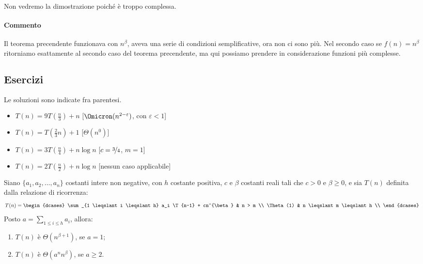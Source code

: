 Non vedremo la dimostrazione poiché è troppo complessa.

\paragraph{Commento}
Il teorema precendente funzionava con \(n^{\beta}\), aveva una serie di condizioni semplificative, ora non ci sono più.
Nel secondo caso se \(f(n) = n^{\beta}\) ritorniamo esattamente al secondo caso del teorema precendente, ma qui possiamo prendere in considerazione funzioni più complesse.

\subsection*{Esercizi}

Le soluzioni sono indicate fra parentesi.
\begin{itemize}
	\item \(T(n) = 9T(\frac{n}{3}) + n\) \hfill[\(\Omicron(n^{2-\varepsilon})\), con \(\varepsilon < 1\)]
	\item \(T(n) = T(\frac{2}{3} n) + 1\)  \hfill[\(\Theta(n^0)\)]
	\item \(T(n) = 3T(\frac{n}{4}) + n\log n\) \hfill[\(c = \nicefrac{3}{4}\), \(m = 1\)]
	\item \(T(n) = 2T(\frac{n}{2}) + n\log n\) \hfill[nessun caso applicabile]
\end{itemize}

\begin{theorem*}
Siano \(\{a_1, a_2, \dots, a_n\}\) costanti intere non negative, con \(h\) costante positiva, \(c\) e \(\beta\) costanti reali tali che \(c > 0\) e \(\beta \geqslant 0\), e sia \(T(n)\) definita dalla relazione di ricorrenza:
\[
	T(n) =
	\begin{dcases}
		\sum_{1 \leqslant i \leqslant h} a_i \T{n-1} + cn^{\beta} & n > m \\
		\Theta(1) & n \leqslant m \leqslant h \\
	\end{dcases}
\]
Posto \(a = \sum_{1 \leqslant i \leqslant h} a_i\), allora:
\begin{enumerate}
	\item \(T(n)\) è \(\Theta(n^{\beta+1})\), se \(a = 1\);
	\item \(T(n)\) è \(\Theta(a^n n^{\beta})\), se \(a \geqslant 2\).
\end{enumerate}
\end{theorem*}

